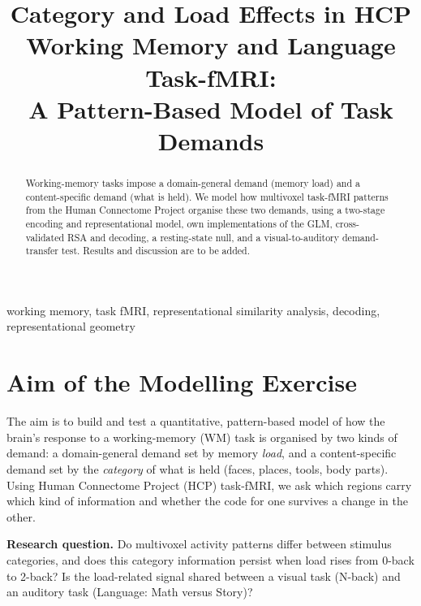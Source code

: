 \documentclass[conference]{IEEEtran}
\begin{document}
\title{Category and Load Effects in HCP Working Memory and Language Task-fMRI: \\ A Pattern-Based Model of Task Demands}

\author{
\and
{}
}

\maketitle

\begin{abstract}
Working-memory tasks impose a domain-general demand (memory load) and a content-specific demand (what is held). We model how multivoxel task-fMRI patterns from the Human Connectome Project organise these two demands, using a two-stage encoding and representational model, own implementations of the GLM, cross-validated RSA and decoding, a resting-state null, and a visual-to-auditory demand-transfer test. Results and discussion are to be added.
\end{abstract}

\begin{IEEEkeywords}
working memory, task fMRI, representational similarity analysis, decoding, representational geometry
\end{IEEEkeywords}

\section{Aim of the Modelling Exercise}
\label{sec:aim}

The aim is to build and test a quantitative, pattern-based model of how the brain's response to a working-memory (WM) task is organised by two kinds of demand: a domain-general demand set by memory \emph{load}, and a content-specific demand set by the \emph{category} of what is held (faces, places, tools, body parts). Using Human Connectome Project (HCP) task-fMRI, we ask which regions carry which kind of information and whether the code for one survives a change in the other.

\textbf{Research question.} Do multivoxel activity patterns differ between stimulus categories, and does this category information persist when load rises from 0-back to 2-back? Is the load-related signal shared between a visual task (N-back) and an auditory task (Language: Math versus Story)?
\end{document}
